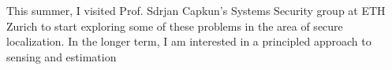 \documentclass[10pt]{article}
\begin{document}
This summer, I visited Prof. Sdrjan Capkun's Systems Security group at ETH Zurich to start exploring some of these problems in the area of secure localization. In the longer term, I am interested in a principled approach to sensing and estimation %

\end{document}
